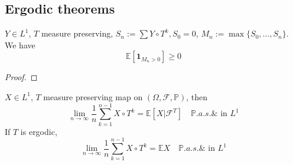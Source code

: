 \subsection{Ergodic theorems}
\begin{lemma}
$Y \in L^1$, $T$ measure preserving, $S_n := \sum Y \circ T^k, S_0 = 0$,  $M_n := \max \{ S_0, \dots, S_n \}$. We have
\begin{equation*}
	\mathbb{E}[\textbf{1}_{M_n > 0}] \geq 0
\end{equation*}
\end{lemma}
\begin{proof}
\end{proof}

\begin{theorem}
$X \in L^1$, $T$ measure preserving map on $(\Omega, \mathcal{F}, \mathbb{P})$, then 
\begin{equation*}
	\lim_{n \rightarrow \infty} \frac{1}{n} \sum_{k = 1}^{n-1} X \circ T^k = \mathbb{E}[X|\mathcal{F}^T] \quad \mathbb{P}.a.s. \& \text{ in $L^1$}
\end{equation*}
If $T$ is ergodic,
\begin{equation*}
	\lim_{n \rightarrow \infty} \frac{1}{n} \sum_{k = 1}^{n-1} X \circ T^k = \mathbb{E}X \quad \mathbb{P}.a.s. \& \text{ in $L^1$}
\end{equation*}
\end{theorem}
